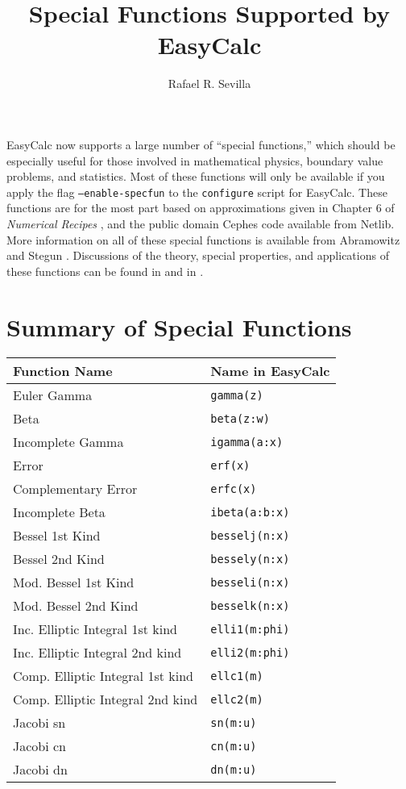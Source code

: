 \documentclass{article}
\begin{document}
\title{Special Functions Supported by EasyCalc}
\author{Rafael R. Sevilla}
\maketitle

EasyCalc now supports a large number of ``special functions,'' which
should be especially useful for those involved in mathematical
physics, boundary value problems, and statistics.  Most of these
functions will only be available if you apply the flag
\texttt{--enable-specfun} to the \texttt{configure} script for
EasyCalc.  These functions are for the most part based on
approximations given in Chapter 6 of \emph{Numerical Recipes}
\cite{press}, and the public domain Cephes code available from Netlib.
More information on all of these special functions is available from
Abramowitz and Stegun \cite{abramowitz}. Discussions of the theory,
special properties, and applications of these functions can be found
in \cite{andrews} and in \cite{whittaker}.

\section*{Summary of Special Functions}

\begin{center}
\begin{tabular}{|l|l|}\hline
Function Name & Name in EasyCalc \\\hline
Euler Gamma & \texttt{gamma(z)} \\\hline
Beta & \texttt{beta(z:w)} \\\hline
Incomplete Gamma & \texttt{igamma(a:x)} \\\hline
Error & \texttt{erf(x)} \\\hline
Complementary Error & \texttt{erfc(x)} \\\hline
Incomplete Beta & \texttt{ibeta(a:b:x)} \\\hline
Bessel 1st Kind & \texttt{besselj(n:x)} \\\hline
Bessel 2nd Kind & \texttt{bessely(n:x)} \\\hline
Mod. Bessel 1st Kind & \texttt{besseli(n:x)} \\\hline
Mod. Bessel 2nd Kind & \texttt{besselk(n:x)} \\\hline
Inc. Elliptic Integral 1st kind & \texttt{elli1(m:phi)} \\\hline
Inc. Elliptic Integral 2nd kind & \texttt{elli2(m:phi)} \\\hline
Comp. Elliptic Integral 1st kind & \texttt{ellc1(m)} \\\hline
Comp. Elliptic Integral 2nd kind & \texttt{ellc2(m)} \\\hline
Jacobi sn & \texttt{sn(m:u)} \\\hline
Jacobi cn & \texttt{cn(m:u)} \\\hline
Jacobi dn & \texttt{dn(m:u)} \\\hline
\end{tabular}
\end{center}
\end{document}
